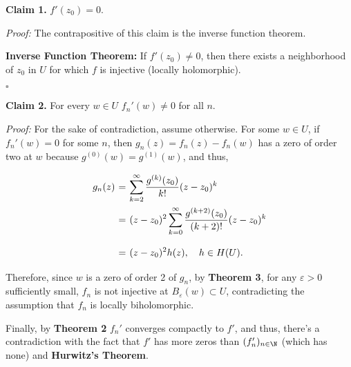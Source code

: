 \textbf{Claim 1.} $f'(z_0) = 0$.

\textit{Proof:} The contrapositive of this claim is the inverse function theorem.
\begin{center}
    \vspace*{-1em}
    \textbf{Inverse Function Theorem:} If $f'(z_0) \neq 0$, then there exists a neighborhood of $z_0$ in $U$ for which $f$ is injective (locally holomorphic). 

    $ $\hfill $\square$
\end{center}

\textbf{Claim 2.} For every $w \in U$ $f_n'(w) \neq 0$ for all $n$.

\textit{Proof:} For the sake of contradiction, assume otherwise. For some $w \in U$, if $f_n'(w) = 0$ for some $n$, then $g_n(z) = f_n(z) - f_n(w)$ has a zero of order two at $w$ because $g^{(0)}(w) = g^{{(1)}}(w)$, and thus,
\[ \everymath{\displaystyle}
\arraycolsep=1.8pt\def\arraystretch{2.5}
\begin{array}{rcl}
    g_n(z) & = & \sum_{k=2}^{\infty} \frac{g^{(k)}(z_0)}{k!} (z-z_0)^k \\
    & = & (z-z_0)^{2} \sum_{k=0}^{\infty} \frac{g^{(k+2)}(z_0)}{(k+2)!} (z-z_0)^k\\
    & = & (z-z_0)^2 h(z), \hspace{1em} h\in H(U).
\end{array}\]
Therefore, since $w$ is a zero of order 2 of $g_n$, by \textbf{Theorem 3}, for any $\varepsilon > 0$ sufficiently small, $f_n$ is not injective at $B_\varepsilon(w) \subset U$, contradicting the assumption that $f_n$ is locally biholomorphic.

Finally, by \textbf{Theorem 2} $f_n'$ converges compactly to $f'$, and thus, there's a contradiction with the fact that $f'$ has more zeros than $(f_n')_{n\in\N}$ (which has none) and \textbf{Hurwitz's Theorem}.


